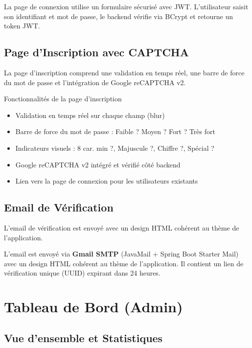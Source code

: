 \documentclass[12pt,a4paper]{report}
\begin{document}
La page de connexion utilise un formulaire s\'{e}curis\'{e} avec JWT. L'utilisateur saisit son identifiant et mot de passe, le backend v\'{e}rifie via BCrypt et retourne un token JWT.

\subsection{Page d'Inscription avec CAPTCHA}

La page d'inscription comprend une validation en temps r\'{e}el, une barre de force du mot de passe et l'int\'{e}gration de Google reCAPTCHA v2.

\begin{notebox}{Fonctionnalit\'{e}s de la page d'inscription}
\begin{itemize}
  \item Validation en temps r\'{e}el sur chaque champ (blur)
  \item Barre de force du mot de passe : Faible ? Moyen ? Fort ? Tr\`{e}s fort
  \item Indicateurs visuels : 8 car. min ?, Majuscule ?, Chiffre ?, Sp\'{e}cial ?
  \item Google reCAPTCHA v2 int\'{e}gr\'{e} et v\'{e}rifi\'{e} c\^{o}t\'{e} backend
  \item Lien vers la page de connexion pour les utilisateurs existants
\end{itemize}
\end{notebox}

\subsection{Email de V\'{e}rification}

L'email de v\'{e}rification est envoy\'{e} avec un design HTML coh\'{e}rent au th\`{e}me de l'application.

L'email est envoy\'{e} via \textbf{Gmail SMTP} (JavaMail + Spring Boot Starter Mail) avec un design HTML coh\'{e}rent au th\`{e}me de l'application. Il contient un lien de v\'{e}rification unique (UUID) expirant dans 24 heures.

\clearpage
\section{Tableau de Bord (Admin)}

\subsection{Vue d'ensemble et Statistiques}
\end{document}
